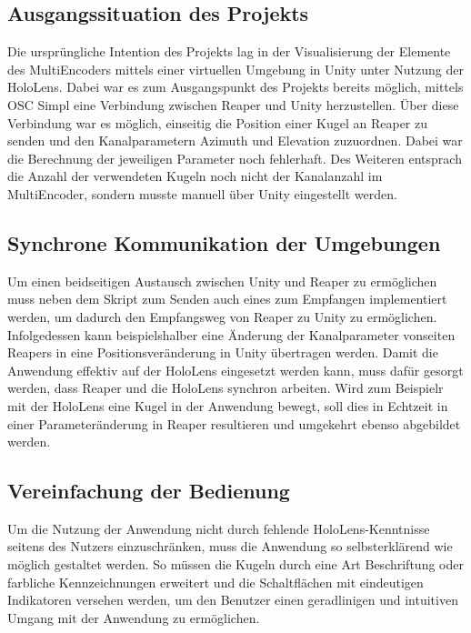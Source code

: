\documentclass[11pt, titlepage, fleqn]{report}
\begin{document}
            \subsection*{Ausgangssituation des Projekts}
                Die ursprüngliche Intention des Projekts lag in der 
                Visualisierung der Elemente des MultiEncoders mittels einer 
                virtuellen Umgebung in Unity unter Nutzung der HoloLens. Dabei war es zum Ausgangspunkt des Projekts bereits 
                möglich, mittels OSC Simpl eine Verbindung zwischen Reaper und Unity herzustellen. Über diese 
                Verbindung war es möglich, einseitig die Position einer Kugel 
                an Reaper zu senden und den Kanalparametern 
                Azimuth und Elevation zuzuordnen. Dabei war die Berechnung der 
                jeweiligen Parameter noch fehlerhaft. 
                Des Weiteren entsprach die Anzahl der verwendeten Kugeln noch 
                nicht der Kanalanzahl im MultiEncoder, sondern musste 
                manuell über Unity eingestellt werden.
            \subsection*{Synchrone Kommunikation der Umgebungen}
                Um einen beidseitigen Austausch zwischen Unity und Reaper zu 
                ermöglichen muss neben dem Skript zum Senden auch eines zum 
                Empfangen implementiert werden, um dadurch den Empfangsweg von 
                Reaper zu Unity zu ermöglichen. Infolgedessen kann 
                beispielshalber eine 
                Änderung der Kanalparameter vonseiten Reapers in eine 
                Positionsveränderung in Unity übertragen werden.\newline	
                Damit die Anwendung effektiv auf der HoloLens eingesetzt werden kann, muss dafür gesorgt werden, dass Reaper und die 
                HoloLens synchron arbeiten. Wird zum Beispielr mit der HoloLens 
                eine Kugel in der Anwendung bewegt, soll dies in 
                Echtzeit in einer Parameteränderung in Reaper resultieren und umgekehrt ebenso abgebildet werden.
            \subsection*{Vereinfachung der Bedienung}
                Um die Nutzung der Anwendung nicht durch fehlende 
                HoloLens-Kenntnisse seitens des Nutzers einzuschränken, muss 
                die 
                Anwendung so selbsterklärend wie möglich gestaltet werden. So 
                müssen 
                die Kugeln durch eine Art Beschriftung oder farbliche 
                Kennzeichnungen 
                erweitert und die Schaltflächen mit eindeutigen Indikatoren 
                versehen 
                werden, um den Benutzer einen geradlinigen und 
                intuitiven Umgang mit der Anwendung zu ermöglichen.
\end{document}
